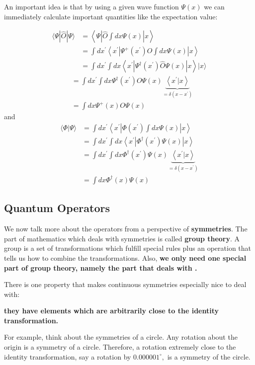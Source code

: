 An important idea is that by using a given wave function $\Psi(x)$ we can immediately calculate important quantities like the expectation value: 
\begin{qt}
    $$
\begin{aligned}
\langle\Psi|\hat{O}| \Psi\rangle &=\left\langle\Psi\left|\hat{O} \int d x \Psi(x)\right| x\right\rangle \\
&=\int d x^{\prime}\left\langle x^{\prime}\left|\Psi^{+}\left(x^{\prime}\right) O \int d x \Psi(x)\right| x\right\rangle \\
&=\int d x^{\prime} \int d x\left\langle x^{\prime}\left|\Psi^{\dagger}\left(x^{\prime}\right) \hat{O} \Psi(x)\right| x\right\rangle|x\rangle
\end{aligned}
$$
$$
\begin{aligned}
&=\int d x^{\prime} \int d x \Psi^{\dagger}\left(x^{\prime}\right) O \Psi(x) \underbrace{\left\langle x^{\prime} | x\right\rangle}_{=\delta\left(x-x^{\prime}\right)}\\
&=\int d x \Psi^{+}(x) O \Psi(x)
\end{aligned}
$$
and
$$
\begin{aligned}
\langle\Phi | \Psi\rangle &=\int d x^{\prime}\left\langle x^{\prime}\left|\Phi\left(x^{\prime}\right) \int d x \Psi(x)\right| x\right\rangle \\
&=\int d x^{\prime} \int d x\left\langle x^{\prime}\left|\Phi^{\dagger}\left(x^{\prime}\right) \Psi(x)\right| x\right\rangle \\
&=\int d x^{\prime} \int d x \Phi^{\dagger}\left(x^{\prime}\right) \Psi(x) \underbrace{\left\langle x^{\prime} | x\right\rangle}_{=\delta\left(x-x^{\prime}\right)} \\
&=\int d x \Phi^{\dagger}(x) \Psi(x)
\end{aligned}
$$
\end{qt}
\subsection{Quantum Operators}
We now talk more about the operators from a perspective of \textbf{symmetries}. The part of mathematics which deals with symmetries is called \textbf{group theory}. A group is a set of transformations which fulfill special rules plus an operation that tells us how to combine the transformations. Also, \textbf{we only need one special part of group theory, namely the part that deals with .}
\begin{qt}
    There is one property that makes continuous symmetries especially
nice to deal with:
\begin{center}
    \textbf{they have elements which are arbitrarily close to the identity transformation.}
\end{center}
\end{qt}
For example, think about the symmetries of a circle. Any rotation about the origin is a symmetry of a circle. Therefore, a rotation extremely close to the identity transformation, say a rotation by $0.000001^{\circ},$ is a symmetry of the circle.

